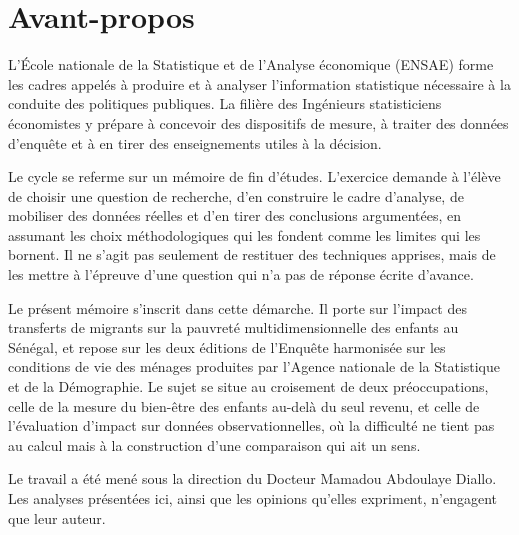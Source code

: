 \section*{Avant-propos}

L'École nationale de la Statistique et de l'Analyse économique (ENSAE) forme
les cadres appelés à produire et à analyser l'information statistique
nécessaire à la conduite des politiques publiques. La filière des Ingénieurs
statisticiens économistes y prépare à concevoir des dispositifs de mesure, à
traiter des données d'enquête et à en tirer des enseignements utiles à la
décision.

Le cycle se referme sur un mémoire de fin d'études. L'exercice demande à
l'élève de choisir une question de recherche, d'en construire le cadre
d'analyse, de mobiliser des données réelles et d'en tirer des conclusions
argumentées, en assumant les choix méthodologiques qui les fondent comme les
limites qui les bornent. Il ne s'agit pas seulement de restituer des
techniques apprises, mais de les mettre à l'épreuve d'une question qui n'a pas
de réponse écrite d'avance.

Le présent mémoire s'inscrit dans cette démarche. Il porte sur l'impact des
transferts de migrants sur la pauvreté multidimensionnelle des enfants au
Sénégal, et repose sur les deux éditions de l'Enquête harmonisée sur les
conditions de vie des ménages produites par l'Agence nationale de la
Statistique et de la Démographie. Le sujet se situe au croisement de deux
préoccupations, celle de la mesure du bien-être des enfants au-delà du seul
revenu, et celle de l'évaluation d'impact sur données observationnelles, où
la difficulté ne tient pas au calcul mais à la construction d'une comparaison
qui ait un sens.

Le travail a été mené sous la direction du Docteur Mamadou Abdoulaye Diallo.
Les analyses présentées ici, ainsi que les opinions qu'elles expriment,
n'engagent que leur auteur.
